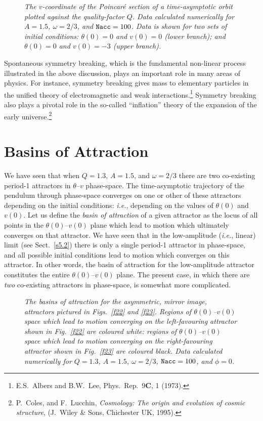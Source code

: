 \begin{figure}
\epsfysize=3in
\centerline{}
\caption{\em The $v$-coordinate of the Poincar\'{e} section of a time-asymptotic orbit
plotted against the quality-factor $Q$. Data
 calculated numerically for
$A=1.5$, $\omega=2/3$, and ${\tt Nacc} =100$. Data is shown for two sets of initial
conditions: $\theta(0)=0$ and $v(0)=0$ (lower branch); and $\theta(0)=0$ and $v(0)=-3$ (upper branch).}\label{f24}
\end{figure}

Spontaneous symmetry breaking, which is the fundamental non-linear process illustrated in the
above discussion,  plays an
important role in many areas of physics. For instance, symmetry breaking gives mass
to elementary particles in the unified theory of electromagnetic and weak interactions.\footnote{E.S.~Albers
and B.W.~Lee, Phys.\ Rep.\ 9{\bf C}, 1 (1973).}
Symmetry breaking also plays a pivotal role in the so-called ``inflation'' theory of the expansion
of the early universe.\footnote{P.~Coles, and F.~Lucchin, {\em Cosmology: The origin and evolution
of cosmic structure}, (J.~Wiley \& Sons, Chichester UK, 1995).}

\section{Basins of Attraction}
We have seen that when $Q=1.3$, $A=1.5$, and $\omega=2/3$ there are two co-existing
period-1 attractors in $\theta$--$v$ phase-space. The time-asymptotic trajectory of the pendulum 
through phase-space converges on one or other of these attractors depending on the initial conditions:
{\em i.e.}, depending on the values of $\theta(0)$ and $v(0)$. 
Let us define the {\em basin of attraction} of a given attractor as the locus of all
points in the $\theta(0)$--$v(0)$ plane which lead to motion which ultimately converges on that attractor.
We have seen that in the low-amplitude ({\em i.e.}, linear) limit (see Sect.~\ref{s5.2}) there is only a
single period-1 attractor  in phase-space, and  all possible initial conditions lead to motion
which converges on this attractor. In other words,  the basin of attraction for the
low-amplitude attractor constitutes the entire $\theta(0)$--$v(0)$ plane. The present
case, in which there are {\em two} co-existing attractors in phase-space, is somewhat more complicated.

\begin{figure}
\epsfysize=4in
\centerline{}
\caption{\em The basins of attraction for the asymmetric, mirror image, attractors
pictured in Figs.~\ref{f22} and \ref{f23}. Regions of $\theta(0)$--$v(0)$
space which lead to motion converging on the left-favouring attractor shown
in Fig.~\ref{f22} are coloured white: regions of $\theta(0)$--$v(0)$
space which lead to motion converging on the right-favouring attractor shown
in Fig.~\ref{f23} are coloured black. Data calculated numerically
for $Q=1.3$, $A=1.5$, $\omega=2/3$, ${\tt Nacc} =100$, and $\phi=0$.
}\label{f25}
\end{figure}

